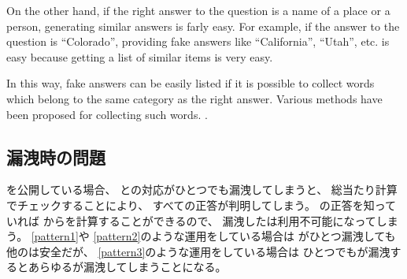 \documentclass{article}
\begin{document}

On the other hand, if the right answer to the question is a name of a place or a person,
generating similar answers is farly easy.
For example, if the answer to the question is ``Colorado'',
providing fake answers like ``California'', ``Utah'', etc.
is easy because getting a list of similar items is very easy.

%
In this way, fake answers can be easily listed
if it is possible to collect words which belong to the same
category as the right answer.
%
Various methods have been proposed for collecting such words.
\cite{Huang:2012:LFC:2426725.2426728}%
\cite{BooWa}%
\cite{Wang:2007:LSE:1441428.1442086}%
\cite{大島裕明:2006-12-15}.%



\subsection{{\PW}漏洩時の問題}

{\SQ}を公開している場合、
{\SS}と{\PW}の対応がひとつでも漏洩してしまうと、
総当たり計算でチェックすることにより、
すべて{\SQ}の正答が判明してしまう。
{\SQ}の正答を知っていれば
{\SS}から{\PW}を計算することができるので、
漏洩した{\SQ}は利用不可能になってしまう。
%
\ref{pattern1}や
\ref{pattern2}のような運用をしている場合は
{\PW}がひとつ漏洩しても他の{\PW}は安全だが、
\ref{pattern3}のような運用をしている場合は
ひとつでも{\PW}が漏洩するとあらゆる{\PW}が漏洩してしまうことになる。
\end{document}
